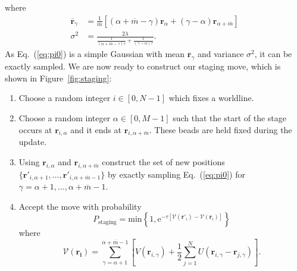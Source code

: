 \documentclass[prb,10pt,aps,floatfix,notitlepage]{revtex4-1}
\renewcommand{\vec}[1]{\boldsymbol{#1}}
\newcommand{\e}[1]{\mathrm{e}^{#1}}
\renewcommand{\eqref}[1]{Eq.~(\ref{#1})}
\begin{document}
%
where 
%
\begin{align}
    \overline{\vec{r}}_\gamma &= \frac{1}{\overline{m}}
    \left[(\alpha+\overline{m}-\gamma)\vec{r}_{\alpha} +
    (\gamma-\alpha)\vec{r}_{\alpha+\overline{m}}\right] \nonumber \\
    \sigma^2 &= \frac{2\lambda}{\frac{1}{(\alpha + \overline{m} - \gamma)\tau} +
\frac{1}{(\gamma-\alpha)\tau}}.
\end{align}
%
As \eqref{eq:pi0} is a simple Gaussian with mean $\overline{\vec{r}}_\gamma$ and
variance $\sigma^2$, it can be exactly sampled.  We are now ready to construct
our staging move, which is shown in Figure~\ref{fig:staging}:
\begin{enumerate}
    \item Choose a random integer $i \in [0,N-1]$ which fixes a worldline.
    \item Choose a random integer $\alpha \in [0,M-1]$ such that the start of
        the stage occurs at $\vec{r}_{i,\alpha}$ and it ends at
        $\vec{r}_{i,\alpha+\overline{m}}$.  These beads are held fixed during
    the update.  \item Using $\vec{r}_{i,\alpha}$ and
        $\vec{r}_{i,\alpha+\overline{m}}$ construct the set of new positions
        $\{\vec{r}'_{i,\alpha+1},\ldots,\vec{r}'_{i,\alpha+\overline{m}-1}\}$ by exactly
        sampling \eqref{eq:pi0} for $\gamma =
        \alpha+1,\ldots,\alpha+\overline{m}-1$.
    \item Accept the move with probability
\begin{equation}
    P_{\text{staging}} = \mathrm{min} 
    \left\{1,\e{-\tau[\mathcal{V}(\vec{r}'_i)-\mathcal{V}(\vec{r}_i)]} \right\}
\end{equation}
%
where 
%
\begin{equation}
    \mathcal{V}(\vec{r_i}) = \sum_{\gamma=\alpha+1}^{\alpha+\overline{m}-1}
    \left[ V(\vec{r}_{i,\gamma}) + \frac{1}{2}\sum_{j=1}^{N}
    U(\vec{r}_{i,\gamma}-\vec{r}_{j,\gamma})\right].
\end{equation}
%
\end{enumerate}
\end{document}
